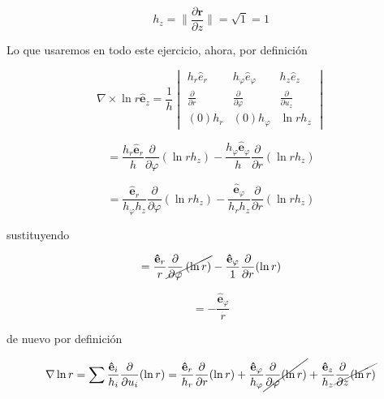 \documentclass[12pt,a4paper]{article}
\providecommand{\norm}[1]{\lVert#1\rVert}
\begin{document}
\begin{enumerate}
    \begin{equation*}
        h_z = \norm{\frac{\partial \textbf{r}}{\partial z}} = \sqrt{1} = 1
    \end{equation*}
     
    Lo que usaremos en todo este ejercicio, ahora, por definición
     
     \begin{equation*}
         \nabla \times \ln{r} \hat{\mathbf{e}}_z = \frac{1}{h}
            \begin{vmatrix}
                h_r \hat{e}_r & h_\varphi \hat{e}_\varphi & h_z \hat{e}_z\\
                \frac{\partial}{\partial r} & \frac{\partial }{\partial \varphi} & \frac{\partial}{\partial u_z}\\
                (0) h_r & (0) h_\varphi & \ln{r} h_z
            \end{vmatrix}
     \end{equation*}
     
     \begin{equation*}
         = \frac{h_r \mathbf{\hat{e}}_r}{h} \frac{\partial}{\partial \varphi} \left(\ln{r} h_z\right) - \frac{h_\varphi \mathbf{\hat{e}}_\varphi}{h} \frac{\partial}{\partial r}(\ln{r}h_z)
     \end{equation*}
     
     \begin{equation*}
         = \frac{\mathbf{\hat{e}}_r}{h_\varphi h_z} \frac{\partial}{\partial \varphi} \left(\ln{r} h_z\right) - \frac{\mathbf{\hat{e}}_\varphi}{h_r h_z} \frac{\partial}{\partial r}(\ln{r}h_z)
     \end{equation*}
     
     sustituyendo
     
     \begin{equation*}
         = \frac{\mathbf{\hat{e}}_r}{r} \cancel{\frac{\partial}{\partial \varphi} \left(\ln{r}\right)} - \frac{\mathbf{\hat{e}}_\varphi}{1} \frac{\partial}{\partial r}(\ln{r})
     \end{equation*}
     
     \begin{equation*}
         =- \frac{\mathbf{\hat{e}}_\varphi}{r}
     \end{equation*}
     
     de nuevo por definición
     
     \begin{equation*}
         \nabla \ln{r} = \sum \frac{\mathbf{\hat{e}}_i}{h_i} \frac{\partial}{\partial u_i} (\ln{r}) = \frac{\mathbf{\hat{e}}_r}{h_r}\frac{\partial}{\partial r} (\ln{r}) + \frac{\mathbf{\hat{e}}_\varphi}{h_\varphi}\cancel{\frac{\partial}{\partial \varphi} (\ln{r})} + \frac{\mathbf{\hat{e}}_z}{h_z}\cancel{\frac{\partial}{\partial z} (\ln{r})}
     \end{equation*}
     

\end{enumerate}
\end{document}
